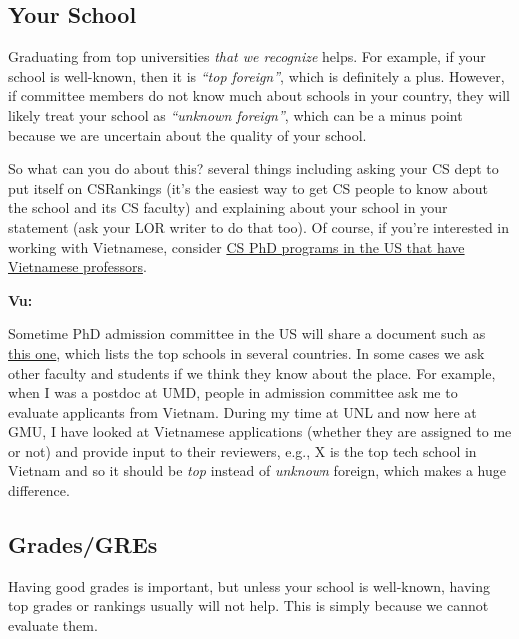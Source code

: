 \documentclass[11pt]{article}
\newenvironment{commentbox}[1][]{
\small
    \begin{mybox}
    {\small \textbf{#1}}
 }{
   \end{mybox}
}
\begin{document}
\subsection{Your School}\label{sec:your-school}

Graduating from top universities \emph{that we recognize} helps. For example, if your school is well-known, then it is \emph{``top foreign''}, which is definitely a plus.
However, if committee members do not know much about schools in your country, they will likely treat your school as
\emph{``unknown foreign''}, which can be a minus point because we are uncertain about the quality of your school.


So what can you do about this? several things including asking your CS dept to put itself on CSRankings (it's the easiest way to get CS people to know about the school and its CS faculty)  and explaining about your school in your statement (ask your LOR writer to do that too). Of course, if you're interested in working with Vietnamese, consider  \href{https://github.com/dynaroars/dynaroars.github.io/wiki/Viet-CS-Profs-US}{CS PhD programs in the US that have Vietnamese professors}.



\begin{commentbox}[Vu:]
Sometime PhD admission committee in the US will share a document such as \href{https://github.com/dynaroars/dynaroars.github.io/wiki/Foreign-Top-Schools}{this one}, which lists the top schools in several countries. In some cases we ask other faculty and students if we think they know about the place.  For example, when I was a postdoc at UMD, people in admission committee ask me to evaluate applicants from Vietnam.  During my time at UNL and now here at GMU, I have looked at Vietnamese applications (whether they are assigned to me or not) and provide input to their reviewers, e.g., X is the top tech school in Vietnam and so it should be \emph{top} instead of \emph{unknown} foreign, which makes a huge difference.
\end{commentbox}



\subsection{Grades/GREs}\label{sec:grades}


Having good grades is important, but unless your school is well-known, having top grades or rankings
usually will not help. This is simply because we cannot evaluate them.
\end{document}
